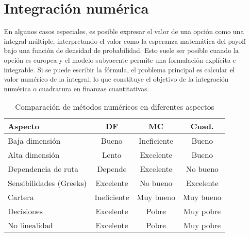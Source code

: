 \section{Integración numérica}
En algunos casos especiales, es posible expresar el valor de una opción como una integral múltiple, interpretando el valor como la esperanza matemática del payoff bajo una función de densidad de probabilidad. Esto suele ser posible cuando la opción es europea y el modelo subyacente permite una formulación explícita e integrable. Si se puede escribir la fórmula, el problema principal es calcular el valor numérico de la integral, lo que constituye el objetivo de la integración numérica o cuadratura en finanzas cuantitativas.





\begin{table}[h]
    \centering
    \begin{tabular}{lccc}
        \hline
        \textbf{Aspecto}      & \textbf{DF}      & \textbf{MC}      & \textbf{Cuad.}   \\
        \hline
        Baja dimensión        & Bueno            & Ineficiente      & Bueno            \\
        Alta dimensión        & Lento            & Excelente        & Bueno            \\
        Dependencia de ruta   & Depende          & Excelente        & No bueno         \\
        Sensibilidades (Greeks) & Excelente      & No bueno         & Excelente        \\
        Cartera               & Ineficiente      & Muy bueno        & Muy bueno        \\
        Decisiones            & Excelente        & Pobre            & Muy pobre        \\
        No linealidad         & Excelente        & Pobre            & Muy pobre        \\
        \hline
    \end{tabular}
    \caption{Comparación de métodos numéricos en diferentes aspectos}
\end{table}

